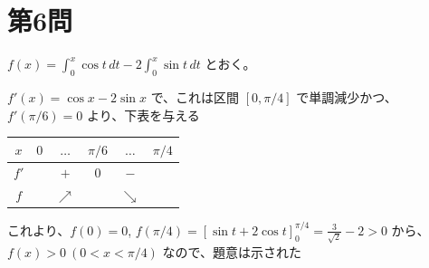 \documentclass[../main.tex]{subfiles}
\begin{document}
\newpage

\section*{第6問}

\noindent
[\textbf{解}] $f(x) = \int_0^x \cos t \, dt - 2 \int_0^x \sin t \, dt$ とおく。

\noindent
$f'(x) = \cos x - 2 \sin x$ で、これは区間 $[0, \pi/4]$ で単調減少かつ、$f'(\pi/6) = 0$ より、下表を与える

\begin{center}
  \begin{tabular}{c|ccccc}
    $x$ & $0$ & $\dots$ & $\pi/6$ & $\dots$ & $\pi/4$ \\ \hline
    $f'$ & & $+$ & $0$ & $-$ & \\ \hline
    $f$ & & $\nearrow$ & & $\searrow$ &
  \end{tabular}
\end{center}

\noindent
これより、$f(0)=0$, $f(\pi/4) = [\sin t + 2 \cos t]_0^{\pi/4} = \frac{3}{\sqrt{2}} - 2 > 0$ から、$f(x) > 0 \ (0 < x < \pi/4)$ なので、題意は示された \quad {}
\end{document}
